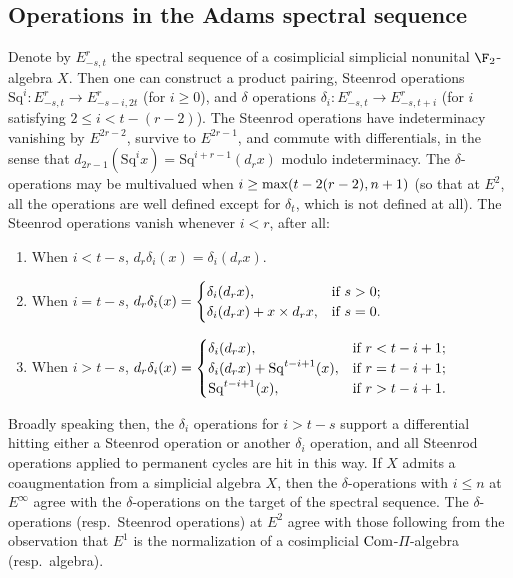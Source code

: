 \documentclass[10pt]{article}
\newcommand{\Sq}{\mathrm{Sq}}
\begin{document}
\begin{AdamsSSEQ operations final}

\section{Operations in the Adams spectral sequence}
\begin{thm}
Denote by $E^r_{-s,t}$ the spectral sequence of a cosimplicial simplicial nonunital $\F_2$-algebra $X$. Then one can construct a product pairing, Steenrod operations $\Sq^i:E^r_{-s,t}\to E^r_{-s-i,2t}$ (for $i\geq0$), and $\delta$ operations $\delta_i:E^r_{-s,t}\to E^r_{-s,t+i}$ (for $i$ satisfying $2\leq i<t-(r-2)$). The Steenrod operations have indeterminacy vanishing by $E^{2r-2}$, survive to $E^{2r-1}$, and commute with differentials, in the sense that $d_{2r-1}(\Sq^ix)=\Sq^{i+r-1}(d_rx)$ modulo indeterminacy. The $\delta$-operations may be multivalued when $i\geq \textup{max}(t-2(r-2),n+1)$ (so that at $E^2$, all the operations are well defined except for $\delta_t$, which is not defined at all). The Steenrod operations vanish whenever $i<r$, after all:
\begin{enumerate}\squishlist
\setlength{\parindent}{.25in}
\item When $i<t-s$, $d_r\delta_i(x)=\delta_i(d_rx)$.
\item When $i=t-s$, $d_r\delta_i(x)=\begin{cases}
\delta_i(d_rx),&\textup{if }s>0;\\
\delta_i(d_rx)+x\times d_rx,&\textup{if }s=0.
\end{cases}$
\item When $i>t-s$, $d_r\delta_i(x)=\begin{cases}
\delta_i(d_rx),&\textup{if }r<t-i+1;\\
\delta_i(d_rx)+\Sq^{t-i+1}(x),&\textup{if }r=t-i+1;\\
\Sq^{t-i+1}(x),&\textup{if }r>t-i+1.\\
\end{cases}$
\end{enumerate}
Broadly speaking then, the $\delta_i$ operations for $i>t-s$ support a differential hitting either a Steenrod operation or another $\delta_i$ operation, and all Steenrod operations applied to permanent cycles are hit in this way. If $X$ admits a coaugmentation from a simplicial algebra $X$, then the $\delta$-operations with $i\leq n$ at $E^\infty$ agree with the $\delta$-operations on the target of the spectral sequence. The $\delta$-operations (resp.\ Steenrod operations)  at $E^2$ agree with those following from the observation that $E^1$ is the normalization of a cosimplicial $\textup{Com}$-$\Pi$-algebra (resp.\ algebra).


\end{thm}
\end{AdamsSSEQ operations final}
\end{document}

